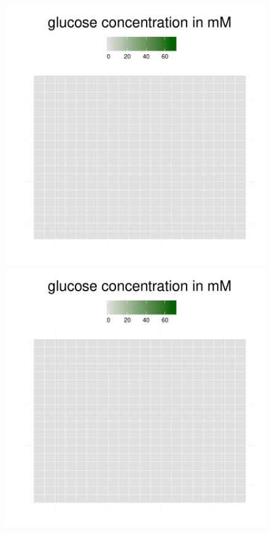 \begin{figure}[h!]
{\begin{minipage}[t]{0.3\textwidth}
  \end{minipage}
  \begin{minipage}[t]{0.3\textwidth}
    \includegraphics[width=\textwidth]{../results/img/barkeri_beijerinckii_20x20_seed2942_glc100.pdf}
  \end{minipage}
  \begin{minipage}[t]{0.3\textwidth}
    \includegraphics[width=\textwidth]{../results/img/barkeri_beijerinckii_20x20_seed2942_glc150.pdf}

\end{minipage}}
\end{figure}
